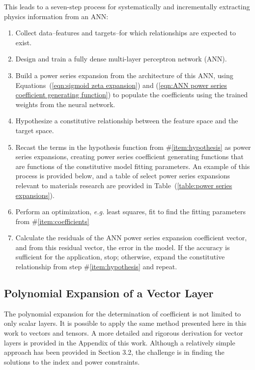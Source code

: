 This leads to a seven-step process for systematically and incrementally extracting physics information from an ANN:
\begin{enumerate}
	\item Collect data--features and targets--for which relationships are expected to exist.
	\item Design and train a fully dense multi-layer perceptron network (ANN).
	\item Build a power series expansion from the architecture of this ANN, using Equations~(\ref{eqn:sigmoid zeta expansion}) and (\ref{eqn:ANN power series coefficient generating function}) to populate the coefficients using the trained weights from the neural network.
	\item Hypothesize a constitutive relationship between the feature space and the target space. \label{item:hypothesis}
	\item Recast the terms in the hypothesis function from \#\ref{item:hypothesis} as power series expansions, creating power series coefficient generating functions that are functions of the constitutive model fitting parameters. An example of this process is provided below, and a table of select power series expansions relevant to materials research are provided in Table~(\ref{table:power series expansions}). \label{item:coefficients}
	\item Perform an optimization, \emph{e.g.} least squares, fit to find the fitting parameters from \#\ref{item:coefficients}
	\item Calculate the residuals of the ANN power series expansion coefficient vector, and from this residual vector, the error in the model. If the accuracy is sufficient for the application, stop; otherwise, expand the constitutive relationship from step \#\ref{item:hypothesis} and repeat.
\end{enumerate}

\subsection{Polynomial Expansion of a Vector Layer}
The polynomial expansion for the determination of coefficient is not limited to only scalar layers. It is possible to apply the same method presented here in this work to vectors and tensors. A more detailed and rigorous derivation for vector layers is provided in the Appendix of this work. Although a relatively simple approach has been provided in Section 3.2, the challenge is in finding the solutions to the index and power constraints.

